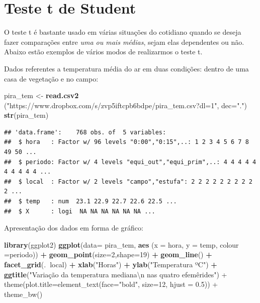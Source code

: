 \documentclass[
]{book}
\newenvironment{Shaded}{\begin{snugshade}}{\end{snugshade}}
\newcommand{\CharTok}[1]{\textcolor[rgb]{0.31,0.60,0.02}{#1}}
\newcommand{\DataTypeTok}[1]{\textcolor[rgb]{0.13,0.29,0.53}{#1}}
\newcommand{\DecValTok}[1]{\textcolor[rgb]{0.00,0.00,0.81}{#1}}
\newcommand{\KeywordTok}[1]{\textcolor[rgb]{0.13,0.29,0.53}{\textbf{#1}}}
\newcommand{\NormalTok}[1]{#1}
\newcommand{\OperatorTok}[1]{\textcolor[rgb]{0.81,0.36,0.00}{\textbf{#1}}}
\newcommand{\StringTok}[1]{\textcolor[rgb]{0.31,0.60,0.02}{#1}}
\begin{document}
\hypertarget{teste-t-de-student}{%
\section{Teste t de Student}\label{teste-t-de-student}}

O teste t é bastante usado em várias situações do cotidiano quando se deseja fazer comparações entre \emph{uma ou mais médias}, sejam elas dependentes ou não.
Abaixo estão exemplos de vários modos de realizarmos o teste t.

Dados referentes a temperatura média do ar em duas condições: dentro de uma casa de vegetação e no campo:

\begin{Shaded}
\begin{Highlighting}[]
\NormalTok{pira_tem <-}\StringTok{ }\KeywordTok{read.csv2}\NormalTok{ (}\StringTok{"https://www.dropbox.com/s/zvp5iftcpb6bdpe/pira_tem.csv?dl=1"}\NormalTok{,}
  \DataTypeTok{dec=}\StringTok{"."}\NormalTok{)}
\KeywordTok{str}\NormalTok{(pira_tem)}
\end{Highlighting}
\end{Shaded}

\begin{verbatim}
## 'data.frame':    768 obs. of  5 variables:
##  $ hora   : Factor w/ 96 levels "0:00","0:15",..: 1 2 3 4 5 6 7 8 49 50 ...
##  $ periodo: Factor w/ 4 levels "equi_out","equi_prim",..: 4 4 4 4 4 4 4 4 4 4 ...
##  $ local  : Factor w/ 2 levels "campo","estufa": 2 2 2 2 2 2 2 2 2 2 ...
##  $ temp   : num  23.1 22.9 22.7 22.6 22.5 ...
##  $ X      : logi  NA NA NA NA NA NA ...
\end{verbatim}

Apresentação dos dados em forma de gráfico:

\begin{Shaded}
\begin{Highlighting}[]
\KeywordTok{library}\NormalTok{(ggplot2)}
\KeywordTok{ggplot}\NormalTok{(}\DataTypeTok{data=}\NormalTok{ pira_tem, }\KeywordTok{aes}\NormalTok{ (}\DataTypeTok{x =}\NormalTok{ hora, }\DataTypeTok{y =}\NormalTok{ temp, }\DataTypeTok{colour =}\NormalTok{periodo)) }\OperatorTok{+}
\StringTok{  }\KeywordTok{geom_point}\NormalTok{(}\DataTypeTok{size=}\DecValTok{2}\NormalTok{,}\DataTypeTok{shape=}\DecValTok{19}\NormalTok{) }\OperatorTok{+}
\StringTok{  }\KeywordTok{geom_line}\NormalTok{() }\OperatorTok{+}
\StringTok{  }\KeywordTok{facet_grid}\NormalTok{(.}\OperatorTok{~}\NormalTok{local) }\OperatorTok{+}
\StringTok{  }\KeywordTok{xlab}\NormalTok{(}\StringTok{"Horas"}\NormalTok{) }\OperatorTok{+}
\StringTok{  }\KeywordTok{ylab}\NormalTok{(}\StringTok{"Temperatura ºC"}\NormalTok{) }\OperatorTok{+}\StringTok{ }
\StringTok{             }\KeywordTok{ggtitle}\NormalTok{(}\StringTok{"Variação da temperatura mediana}\CharTok{\textbackslash{}n}\StringTok{ nas quatro efemêrides") +}
\StringTok{             theme(plot.title=element_text(face="}\NormalTok{bold}\StringTok{", size=12, hjust = 0.5))  +}
\StringTok{  theme_bw()}
\end{Highlighting}
\end{Shaded}
\end{document}
